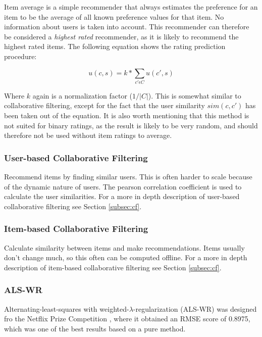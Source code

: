 Item average is a simple recommender that always estimates the preference for an item to be the average of all known preference values for that item. No information about users is taken into account. This recommender can therefore be considered a \emph{highest rated} recommender, as it is likely to recommend the highest rated items. The following equation shows the rating prediction procedure:

\begin{equation}
\label{equation:itemaverageratingprediction}
u(c,s) = k * \sum_{c' \epsilon C} u(c',s)
\end{equation}

Where $k$ again is a normalization factor ($1/|C|$). This is somewhat similar to collaborative filtering, except for the fact that the user similarity $sim(c, c')$ has been taken out of the equation. It is also worth mentioning that this method is not suited for binary ratings, as the result is likely to be very random, and should therefore not be used without item ratings to average.

\subsubsection{User-based Collaborative Filtering}

Recommend items by finding similar users. This is often harder to scale because of the dynamic nature of users. The pearson correlation coefficient is used to calculate the user similarities. For a more in depth description of user-based collaborative filtering see Section \ref{subsec:cf}.

\subsubsection{Item-based Collaborative Filtering}

Calculate similarity between items and make recommendations. Items usually don't change much, so this often can be computed offline. For a more in depth description of item-based collaborative filtering see Section \ref{subsec:cf}.%

\subsubsection{ALS-WR}

Alternating-least-squares with weighted-$\lambda$-regularization (ALS-WR) was designed fro the Netflix Prize Competition \cite{Netflix}, where it obtained an RMSE score of 0.8975, which was one of the best results based on a pure method.

